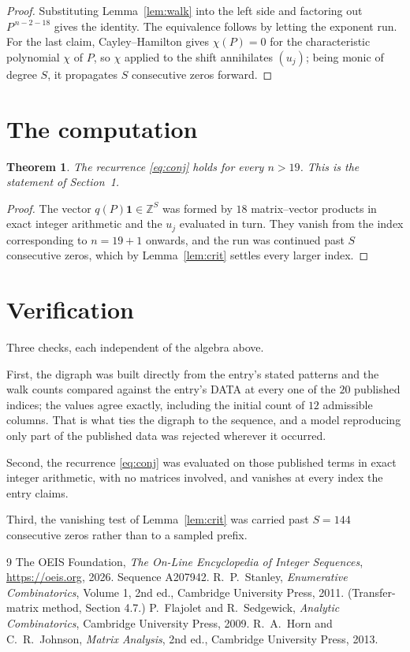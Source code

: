 \documentclass[11pt,a4paper]{article}
\theoremstyle{plain}
\newtheorem{theorem}{Theorem}
\theoremstyle{definition}
\begin{document}
\begin{proof}
Substituting Lemma~\ref{lem:walk} into the left side and factoring out
$P^{\,n-2-18}$ gives the identity. The equivalence follows by letting the exponent
run. For the last claim, Cayley--Hamilton gives $\chi(P)=0$ for the characteristic
polynomial $\chi$ of $P$, so $\chi$ applied to the shift annihilates $(u_j)$; being monic of
degree $S$, it propagates $S$ consecutive zeros forward.
\end{proof}

\section{The computation}

\begin{theorem}
The recurrence \eqref{eq:conj} holds for every $n>19$. This is the statement of
Section~1.
\end{theorem}

\begin{proof}
The vector $q(P)\mathbf{1}\in\mathbb{Z}^{S}$ was formed by $18$ matrix--vector
products in exact integer arithmetic and the $u_j$ evaluated in turn. They vanish from the
index corresponding to $n=19+1$ onwards, and the run was continued past $S$ consecutive
zeros, which by Lemma~\ref{lem:crit} settles every larger index.
\end{proof}

\section{Verification}

Three checks, each independent of the algebra above.

First, the digraph was built directly from the entry's stated patterns and the walk counts
compared against the entry's DATA at every one of the $20$ published indices; the
values agree exactly, including the initial count of $12$ admissible columns. That is
what ties the digraph to the sequence, and a model reproducing only part of the published
data was rejected wherever it occurred.

Second, the recurrence \eqref{eq:conj} was evaluated on those published terms in exact
integer arithmetic, with no matrices involved, and vanishes at every index the entry claims.

Third, the vanishing test of Lemma~\ref{lem:crit} was carried past $S=144$ consecutive
zeros rather than to a sampled prefix.

\begin{thebibliography}{9}
 The OEIS Foundation, \emph{The On-Line Encyclopedia of Integer
Sequences}, \url{https://oeis.org}, 2026. Sequence A207942.
 R.~P.~Stanley, \emph{Enumerative Combinatorics}, Volume 1, 2nd ed.,
Cambridge University Press, 2011. (Transfer-matrix method, Section 4.7.)
 P.~Flajolet and R.~Sedgewick, \emph{Analytic Combinatorics}, Cambridge
University Press, 2009.
 R.~A.~Horn and C.~R.~Johnson, \emph{Matrix Analysis}, 2nd ed., Cambridge
University Press, 2013.
\end{thebibliography}
\end{document}

